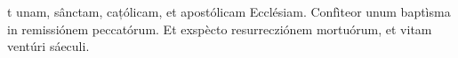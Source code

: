 t unam, sânctam, cațólicam, et apostólicam Ecclésiam. Confìteor unum baptìsma in remissiónem peccatórum. Et exspècto resurrecziónem mortuórum, et vitam ventúri sáeculi.
